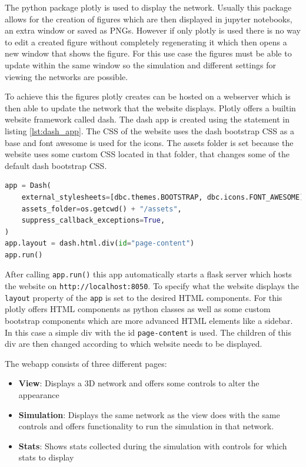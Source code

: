 The python package plotly \cite{plotly} is used to display the network. Usually this 
package allows for the creation of figures which are then displayed in jupyter notebooks,
an extra window or saved as PNGs. However if only plotly is used there is no way to
edit a created figure without completely regenerating it which then opens a new window
that shows the figure. For this use case the figures must be able to update within the 
same window so the simulation and different settings for viewing the networks are possible.

To achieve this the figures plotly creates can be hosted on a webserver which is then
able to update the network that the website displays. Plotly offers a builtin website framework
called dash. The dash app is created using the statement in listing \ref{lst:dash_app}.
The CSS of the website uses the dash bootstrap CSS as a base and font awesome 
\cite{fontAwesome} is used for the icons. The assets folder is set because the website
uses some custom CSS located in that folder, that changes some of the default dash bootstrap CSS.

\begin{lstlisting}[language=python, caption={Instatiate a new Dash app}, label={lst:dash_app}]
app = Dash(
    external_stylesheets=[dbc.themes.BOOTSTRAP, dbc.icons.FONT_AWESOME],
    assets_folder=os.getcwd() + "/assets",
    suppress_callback_exceptions=True,
)
app.layout = dash.html.div(id="page-content")
app.run()
\end{lstlisting}

After calling \texttt{app.run()} this app automatically starts a flask server which hosts 
the website on \texttt{http://localhost:8050}. To specify what the website displays the
\texttt{layout} property of the \texttt{app} is set to the desired HTML components. For this
plotly offers HTML components as python classes as well as some custom bootstrap components
which are more advanced HTML elements like a sidebar. In this
case a simple div with the id \texttt{page-content} is used. The children of this div
are then changed according to which website needs to be displayed.

The webapp consists of three different pages:
\begin{itemize}
    \item \textbf{View}: Displays a 3D network and offers some controls to alter the appearance
    \item \textbf{Simulation}: Displays the same network as the view does with the same controls and
    offers functionality to run the simulation in that network.
    \item \textbf{Stats}: Shows stats collected during the simulation with controls for which 
    stats to display
\end{itemize}

